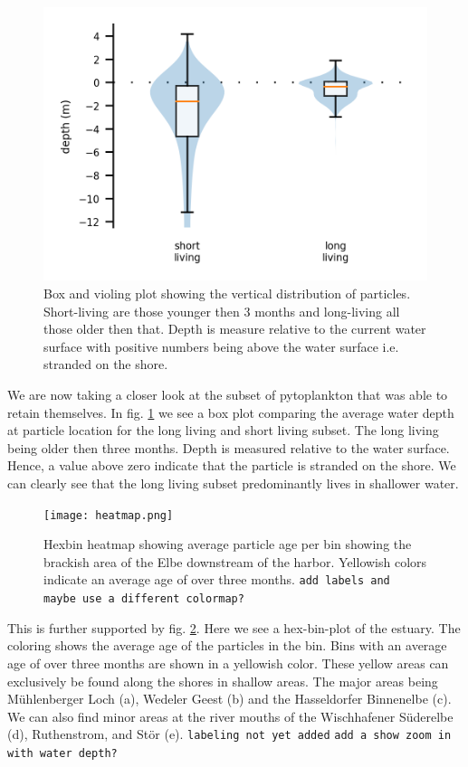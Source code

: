 \begin{figure}
    \includegraphics[width=\columnwidth]{retention_boxplot.png}
    \caption[]{Box and violing plot showing the vertical distribution of particles.  Short-living are those younger then 3 months and long-living all those older then that. Depth is measure relative to the current water surface with positive numbers being above the water surface i.e. stranded on the shore.}
    \label{fig:migration-long-vs-short}
\end{figure}

We are now taking a closer look at the subset of pytoplankton that was able to retain themselves.
In fig. \ref{fig:migration-long-vs-short} we see a box plot comparing the average water depth at particle location for the long living and short living subset. The long living being older then three months.
Depth is measured relative to the water surface. Hence, a value above zero indicate that the particle is stranded on the shore.
We can clearly see that the long living subset predominantly lives in shallower water.

\begin{figure}
    \texttt{[image: heatmap.png]}
    \caption[]{Hexbin heatmap showing average particle age per bin showing the brackish area of the Elbe downstream of the harbor.  Yellowish colors indicate an average age of over three months. \texttt{add labels and maybe use a different colormap?}}
    \label{fig:migration-long-vs-short-heatmap}
\end{figure}

This is further supported by fig. \ref{fig:migration-long-vs-short-heatmap}.
Here we see a hex-bin-plot of the estuary. The coloring shows the average age of the particles in the bin.
Bins with an average age of over three months are shown in a yellowish color.
These yellow areas can exclusively be found along the shores in shallow areas.
The major areas being Mühlenberger Loch (a), Wedeler Geest (b) and the Hasseldorfer Binnenelbe (c). We can also find minor areas at the river mouths of the Wischhafener Süderelbe (d), Ruthenstrom, and Stör (e). \texttt{labeling not yet added}
\texttt{add a show zoom in with water depth?}





